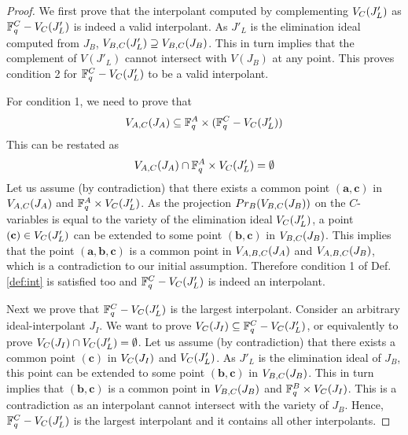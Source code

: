 \begin{proof} 
We first prove that the interpolant computed by
complementing ${V_C}(J'_L)$  as ${\mathbb{F}}_{q}^C - {V_C}(J'_L)$ is indeed a valid
interpolant. As $J'_L$ is the elimination ideal computed from $J_B$,
${V_{B,C}}(J'_L) \supseteq {V_{B,C}}(J_B)$. This in turn implies that the
complement of $V(J'_L)$ cannot intersect with $V(J_B)$ at any
point. This proves condition 2 for ${\mathbb{F}}_{q}^C - {V_C}(J'_L)$ to be a
valid interpolant.  

For condition 1, we need to prove that
\begin{align*}
{V_{A,C}}(J_A) \subseteq {\mathbb{F}}_{q}^A \times ({\mathbb{F}}_{q}^C - {V_C}(J'_L))
\end{align*}
This can be restated as
\begin{align*}
{V_{A,C}}(J_A) \cap {\mathbb{F}}_{q}^A \times {V_C}(J'_L) = \emptyset
\end{align*}
Let us assume (by contradiction) that there exists a common point 
$(\mathbf{a},\mathbf{c})$ in ${V_{A,C}}(J_A)$ and ${\mathbb{F}}_{q}^A \times
V_C(J'_L)$. As the projection $Pr_B({V_{B,C}}(J_B))$ on the
$C$-variables is equal to  the variety of the elimination ideal
${V_C}(J'_L)$, a point $(\mathbf{c}) \in {V_C}(J'_L)$ can be  extended to
some point $(\mathbf{b},\mathbf{c})$ in ${V_{B,C}}(J_B)$. This implies that
the point $(\mathbf{a},\mathbf{b},\mathbf{c})$ is a common point in
${V_{A,B,C}}(J_A)$ and ${V_{A,B,C}}(J_B)$, which is a contradiction to our initial
assumption. Therefore condition 1 of Def. \ref{def:int} is satisfied
too and ${\mathbb{F}}_{q}^C - {V_C}(J'_L)$ is indeed an interpolant. 

\par \noindent Next we prove that ${\mathbb{F}}_{q}^C - {V_C}(J'_L)$ is the largest
interpolant. Consider an arbitrary ideal-interpolant $J_I$. We want to
prove ${V_C}(J_I) \subseteq {\mathbb{F}}_{q}^C - {V_C}(J'_L)$, or equivalently to prove
${V_C}(J_I) \cap {V_C}(J'_L) = \emptyset$. Let us assume (by contradiction) 
that there exists a common point $(\mathbf{c})$ in ${V_C}(J_I)$ and
${V_C}(J'_L)$. As $J'_L$ is the elimination ideal of $J_B$, this point
can be extended to some point $(\mathbf{b},\mathbf{c})$  
in ${V_{B,C}}(J_B)$. This in turn implies that $(\mathbf{b},\mathbf{c})$ is
a common point in  ${V_{B,C}}(J_B)$ and ${\mathbb{F}}_{q}^B \times {V_C}(J_I)$. This is a
contradiction as an interpolant cannot intersect with the variety of
$J_B$. Hence, ${\mathbb{F}}_{q}^C - {V_C}(J'_L)$ is the largest interpolant and it
contains all other interpolants.

\end{proof}


